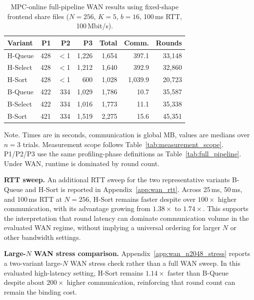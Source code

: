 \documentclass[conference,compsoc,letterpaper]{IEEEtran}
\theoremstyle{definition}
\theoremstyle{remark}
\newcommand{\scorebits}{b}
\newcommand{\HSort}{H-Sort}
\newcommand{\HQueue}{H-Queue}
\newcommand{\HSelect}{H-Select}
\newcommand{\BSort}{B-Sort}
\newcommand{\BQueue}{B-Queue}
\newcommand{\BSelect}{B-Select}
\begin{document}
\begin{table}[t]
\centering
\small
\caption{MPC-online full-pipeline WAN results using fixed-shape frontend share files ($N=256$, $K=5$, $\scorebits=16$, 100\,ms RTT, 100\,Mbit/s).}
\label{tab:wan_full}
\begin{tabular}{@{}lrrrrrr@{}}
\toprule
\textbf{Variant} &
\textbf{P1} & \textbf{P2} & \textbf{P3} &
\textbf{Total} & \textbf{Comm.} & \textbf{Rounds} \\
\midrule
\HQueue{}  & 428 &   $<$1 & 1{,}226 & 1{,}654 &   397.1 & 33{,}148 \\
\HSelect{}  & 428 &   $<$1 & 1{,}212 & 1{,}640 &   392.9 & 32{,}860 \\
\HSort{}  & 428 &   $<$1 &   600   & 1{,}028 & 1{,}039.9 & 20{,}723 \\
\BQueue{}  & 422 & 334 & 1{,}029 & 1{,}786 &     10.7 & 35{,}587 \\
\BSelect{}  & 422 & 334 & 1{,}016 & 1{,}773 &    11.1 & 35{,}338 \\
\BSort{}    & 421 & 334 & 1{,}519 & 2{,}275 &    15.6 & 45{,}351 \\
\bottomrule
\end{tabular}

\vspace{2pt}
\footnotesize
\parbox{\linewidth}{
{Note.} Times are in seconds, communication is global MB, values are medians over $n=3$ trials.
Measurement scope follows Table~\ref{tab:measurement_scope}. P1/P2/P3 use the same profiling-phase definitions as Table~\ref{tab:full_pipeline}.
Under WAN, runtime is dominated by round count.}
\vspace{-4mm}
\end{table}

\smallskip
\noindent\textbf{RTT sweep.}
An additional RTT sweep for the two representative variants \BQueue{} and \HSort{} is reported in Appendix~\ref{app:wan_rtt}.
Across 25\,ms, 50\,ms, and 100\,ms RTT at $N=256$, \HSort{} remains faster despite over $100\times$ higher communication, with its advantage growing from $1.38\times$ to $1.74\times$.
This supports the interpretation that round latency can dominate communication volume in the evaluated WAN regime, without implying a universal ordering for larger $N$ or other bandwidth settings.

\noindent\textbf{Large-$N$ WAN stress comparison.}
Appendix~\ref{app:wan_n2048_stress} reports a two-variant large-$N$ WAN stress check rather than a full WAN sweep.
In this evaluated high-latency setting, \HSort{} remains $1.14\times$ faster than \BQueue{} despite about $200\times$ higher communication, reinforcing that round count can remain the binding cost.
\end{document}
